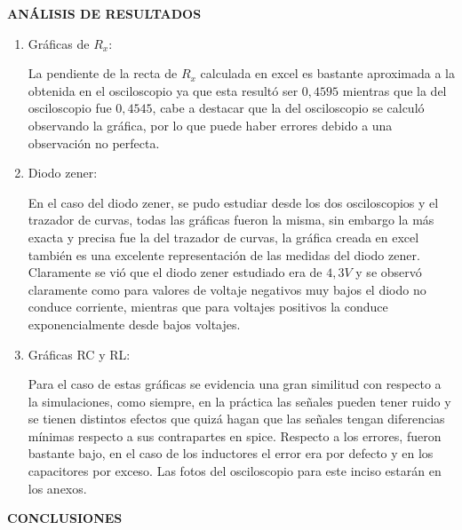 \documentclass[12pt]{article}
\begin{document}
	\newpage
	
	\begin{center}
		\textbf{\large ANÁLISIS DE RESULTADOS}\\
	\end{center}
	
	\renewcommand{\theenumi}{\alph{enumi}} %
	
	\begin{enumerate}
		\item Gráficas de $R_x$:
		
		\noindent La pendiente de la recta de $R_x$ calculada en excel es bastante aproximada a la obtenida en el osciloscopio ya que esta resultó ser $0,4595$ mientras que la del osciloscopio fue $0,4545$, cabe a destacar que la del osciloscopio se calculó observando la gráfica, por lo que puede haber errores debido a una observación no perfecta.
		
		\item Diodo zener:
		
		\noindent En el caso del diodo zener, se pudo estudiar desde los dos osciloscopios y el trazador de curvas, todas las gráficas fueron la misma, sin embargo la más exacta y precisa fue la del trazador de curvas, la gráfica creada en excel también es una excelente representación de las medidas del diodo zener. Claramente se vió que el diodo zener estudiado era de $4,3V$ y se observó claramente como para valores de voltaje negativos muy bajos el diodo no conduce corriente, mientras que para voltajes positivos la conduce exponencialmente desde bajos voltajes.
		
		\item Gráficas RC y RL:
		
		\noindent Para el caso de estas gráficas se evidencia una gran similitud con respecto a la simulaciones, como siempre, en la práctica las señales pueden tener ruido y se tienen distintos efectos que quizá hagan que las señales tengan diferencias mínimas respecto a sus contrapartes en spice. Respecto a los errores, fueron bastante bajo, en el caso de los inductores el error era por defecto y en los capacitores por exceso. Las fotos del osciloscopio para este inciso estarán en los anexos.
	\end{enumerate}
	
	\newpage
	
	\begin{center}
		\textbf{\large CONCLUSIONES}\\
	\end{center}
	
\end{document}
